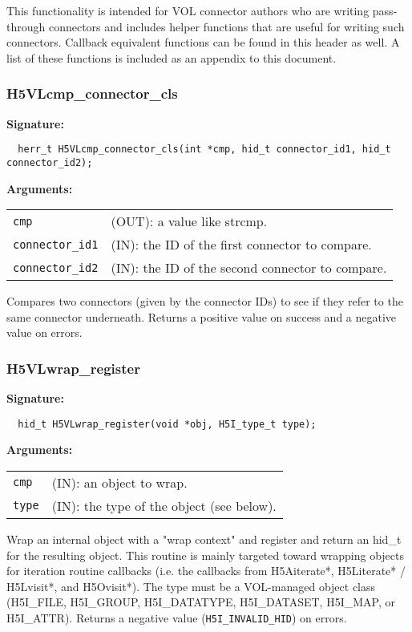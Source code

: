 This functionality is intended for VOL connector authors who are writing
pass-through connectors and includes helper functions that are useful for
writing such connectors. Callback equivalent functions can be found in this
header as well. A list of these functions is included as an appendix to this
document.


\subsubsection{H5VLcmp\_connector\_cls}
\begin{mdframed}[style=bgbox]
\textbf{Signature:}
\begin{lstlisting}
  herr_t H5VLcmp_connector_cls(int *cmp, hid_t connector_id1, hid_t connector_id2);
\end{lstlisting}
\textbf{Arguments:}\\
\begin{tabular}{l p{13.5cm}}
 {\tt cmp} & (OUT): a value like strcmp.\\
 {\tt connector\_id1} & (IN): the ID of the first connector to compare.\\
 {\tt connector\_id2} & (IN): the ID of the second connector to compare.\\
\end{tabular}
\end{mdframed}
Compares two connectors (given by the connector IDs) to see if they refer to the
same connector underneath.
Returns a positive value on success and a negative value on errors.
\bigskip


\subsubsection{H5VLwrap\_register}
\begin{mdframed}[style=bgbox]
\textbf{Signature:}
\begin{lstlisting}
  hid_t H5VLwrap_register(void *obj, H5I_type_t type);
\end{lstlisting}
\textbf{Arguments:}\\
\begin{tabular}{l p{13.5cm}}
 {\tt cmp} & (IN): an object to wrap.\\
 {\tt type} & (IN): the type of the object (see below).\\
\end{tabular}
\end{mdframed}
Wrap an internal object with a "wrap context" and register and return an
hid\_t for the resulting object. This routine is mainly targeted toward wrapping
objects for iteration routine callbacks (i.e. the callbacks from H5Aiterate*,
H5Literate* / H5Lvisit*, and H5Ovisit*). The type must be a VOL-managed object
class (H5I\_FILE, H5I\_GROUP, H5I\_DATATYPE, H5I\_DATASET, H5I\_MAP, or H5I\_ATTR).
Returns a negative value ({\tt H5I\_INVALID\_HID}) on errors.
\bigskip


